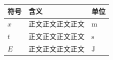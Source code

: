 \begingroup\songti{}
\begin{longtable}{@{}p{25mm}p{80mm}p{30mm}@{}}
\toprule 符号 & 含义 & 单位 \\
\midrule\endhead
$x$ & 正文正文正文正文 & $\mathrm{m}$ \\
$t$ & 正文正文正文正文 & $\mathrm{s}$ \\
$E$ & 正文正文正文正文 & $\mathrm{J}$ \\
\bottomrule
\end{longtable}
\endgroup

